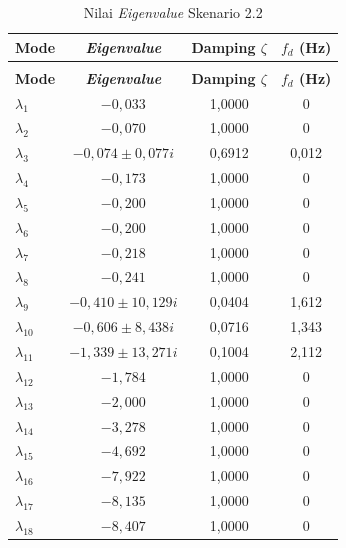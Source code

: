 \begingroup
\fontsize{11}{13.2}\selectfont
\setlength{\tabcolsep}{7pt}
\begin{longtable}{>{\centering\arraybackslash}m{1.5cm} c c c} \caption[]{Nilai
	\textit{Eigenvalue} Skenario 2.2} \label{tab:eigenvalue_sk22_lampiran} \\
	\toprule
	\textbf{Mode} & \textbf{\textit{Eigenvalue}} & \textbf{Damping $\zeta$} &
	\textbf{$f_d$ (Hz)} \\
	\midrule
	\endfirsthead
	\multicolumn{4}{l}{\textit{(lanjutan)}} \\
	\toprule
	\textbf{Mode} & \textbf{\textit{Eigenvalue}} & \textbf{Damping $\zeta$} &
	\textbf{$f_d$ (Hz)} \\
	\midrule
	\endhead
	\bottomrule
	\endfoot
	$\lambda_1$  & $-0{,}033$                    & 1,0000 & 0 \\
	$\lambda_2$  & $-0{,}070$                    & 1,0000 & 0 \\
	$\lambda_3$  & $-0{,}074 \pm 0{,}077i$       & 0,6912 & 0,012 \\
	$\lambda_4$  & $-0{,}173$                    & 1,0000 & 0 \\
	$\lambda_5$  & $-0{,}200$                    & 1,0000 & 0 \\
	$\lambda_6$  & $-0{,}200$                    & 1,0000 & 0 \\
	$\lambda_7$  & $-0{,}218$                    & 1,0000 & 0 \\
	$\lambda_8$  & $-0{,}241$                    & 1,0000 & 0 \\
	$\lambda_9$  & $-0{,}410 \pm 10{,}129i$      & 0,0404 & 1,612 \\
	$\lambda_{10}$ & $-0{,}606 \pm 8{,}438i$     & 0,0716 & 1,343 \\
	$\lambda_{11}$ & $-1{,}339 \pm 13{,}271i$    & 0,1004 & 2,112 \\
	$\lambda_{12}$ & $-1{,}784$                  & 1,0000 & 0 \\
	$\lambda_{13}$ & $-2{,}000$                  & 1,0000 & 0 \\
	$\lambda_{14}$ & $-3{,}278$                  & 1,0000 & 0 \\
	$\lambda_{15}$ & $-4{,}692$                  & 1,0000 & 0 \\
	$\lambda_{16}$ & $-7{,}922$                  & 1,0000 & 0 \\
	$\lambda_{17}$ & $-8{,}135$                  & 1,0000 & 0 \\
	$\lambda_{18}$ & $-8{,}407$                  & 1,0000 & 0 \\

\end{longtable}

